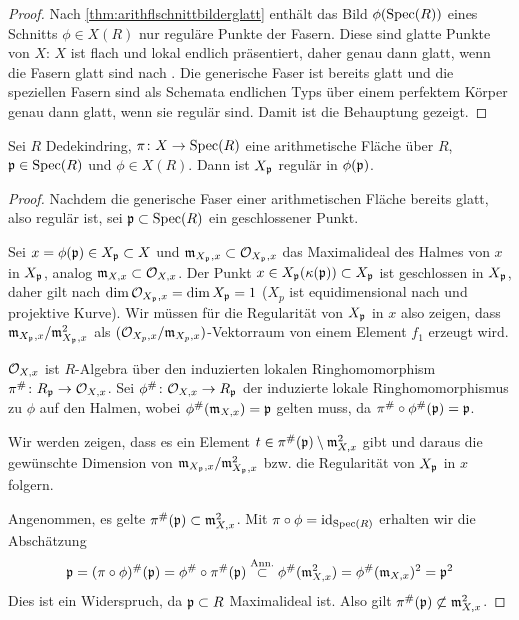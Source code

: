 \documentclass[german]{scrreprt}
\begin{document}
\begin{Satz}
\begin{proof}
    Nach \ref{thm:arithflschnittbilderglatt} enthält das Bild
    $\phi(\operatorname{Spec}(R))$ eines Schnitts $\phi\in X(R)$ nur reguläre
    Punkte der Fasern. Diese sind glatte Punkte von $X$:
    $X$ ist flach und lokal endlich präsentiert, daher genau dann
    glatt, wenn die Fasern glatt sind nach
    \cite[8.5, Proposition 17]{bosch}.
    Die generische Faser ist bereits glatt und die speziellen Fasern
    sind als Schemata endlichen Typs über einem perfektem Körper
    genau dann glatt, wenn sie regulär sind.
    Damit ist die Behauptung gezeigt.
  \end{proof}
\end{Satz}

\begin{Lemma}\label{thm:arithflschnittbilderglatt}
  \cite[Proposition IV.4.3]{silverman2}
  Sei $R$ Dedekindring,
  $\pi\colon X\to\operatorname{Spec}(R)$ eine arithmetische Fläche über $R$,
  $\mathfrak{p}\in\operatorname{Spec}(R)$ und $\phi\in X(R)$.
  Dann ist $X_{\mathfrak{p}}$ regulär in $\phi(\mathfrak{p})$.
  \begin{proof}
    Nachdem die generische Faser einer arithmetischen Fläche bereits
    glatt, also regulär ist, sei $\mathfrak{p}\subset\operatorname{Spec}(R)$ ein geschlossener
    Punkt.
    
    Sei $x=\phi(\mathfrak{p})\in X_{\mathfrak{p}}\subset X$ und $\mathfrak{m}_{X_{\mathfrak{p}},x}\subset\mathcal{O}_{X_{\mathfrak{p}},x}$
    das Maximalideal des Halmes von $x$ in $X_{\mathfrak{p}}$,
    analog $\mathfrak{m}_{X,x}\subset\mathcal{O}_{X,x}$.
    Der Punkt $x\in X_{\mathfrak{p}}(\kappa(\mathfrak{p}))\subset X_{\mathfrak{p}}$ ist geschlossen in $X_{\mathfrak{p}}$,
    daher gilt nach \cite[Corollary 2.5.24]{liu}
    $\dim\mathcal{O}_{X_{\mathfrak{p}},x}=\dim X_{\mathfrak{p}}=1$ ($X_p$ ist equidimensional nach
    \cite[Proposition 4.4.16]{liu} und projektive Kurve).
    Wir müssen für die Regularität von $X_{\mathfrak{p}}$ in $x$ also zeigen, dass
    $\mathfrak{m}_{X_{\mathfrak{p}},x}/\mathfrak{m}_{X_{\mathfrak{p}},x}^2$ als $(\mathcal{O}_{X_p,x}/\mathfrak{m}_{X_p,x})$-Vektorraum
    von einem Element $f_1$ erzeugt wird.
    
    $\mathcal{O}_{X,x}$ ist $R$-Algebra über den induzierten lokalen
    Ringhomomorphism $\pi^\#\colon R_{\mathfrak{p}}\to\mathcal{O}_{X,x}$.
    Sei $\phi^\#\colon\mathcal{O}_{X,x}\to R_{\mathfrak{p}}$ der induzierte lokale
    Ringhomomorphismus zu $\phi$ auf den Halmen, wobei
    $\phi^\#(\mathfrak{m}_{X,x})=\mathfrak{p}$ gelten muss, da $\pi^\#\circ\phi^\#(\mathfrak{p})=\mathfrak{p}$.
    
    Wir werden zeigen, dass es ein Element
    $t\in\pi^\#(\mathfrak{p})\setminus\mathfrak{m}_{X,x}^2$ gibt und
    daraus die gewünschte Dimension von $\mathfrak{m}_{X_{\mathfrak{p}},x}/\mathfrak{m}_{X_{\mathfrak{p}},x}^2$
    bzw. die Regularität von $X_{\mathfrak{p}}$ in $x$ folgern.

    Angenommen, es gelte $\pi^\#(\mathfrak{p})\subset\mathfrak{m}_{X,x}^2$.
    Mit $\pi\circ\phi=\mathrm{id}_{\operatorname{Spec}(R)}$ erhalten wir die Abschätzung
    \begin{gather*}
      \mathfrak{p} = (\pi\circ\phi)^\#(\mathfrak{p})
      = \phi^\#\circ\pi^\#(\mathfrak{p})
      \overset{\text{Ann.}}{\subset} \phi^\#(\mathfrak{m}_{X,x}^2)
      = \phi^\#(\mathfrak{m}_{X,x})^2
      = \mathfrak{p}^2
    \end{gather*}
    Dies ist ein Widerspruch, da $\mathfrak{p}\subset R$ Maximalideal ist. Also
    gilt $\pi^\#(\mathfrak{p})\not\subset\mathfrak{m}_{X,x}^2$.


\end{proof}
\end{Lemma}
\end{document}

